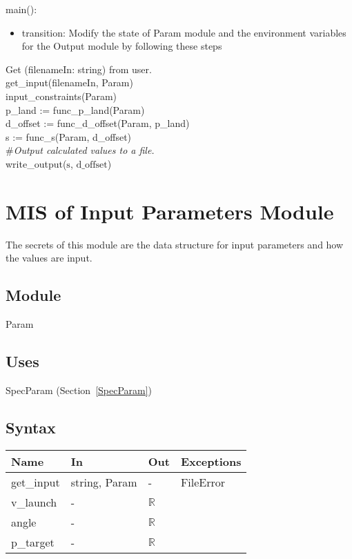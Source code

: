\documentclass[12pt, titlepage]{article}
\begin{document}
\noindent main():
\begin{itemize}
\item transition: Modify the state of Param module and the environment variables
  for the Output module by following these steps\\
\end{itemize}

\noindent Get (filenameIn: string) from user.\\
\noindent get\_input(filenameIn, Param)\\
\noindent input\_constraints(Param)\\
\noindent p\_land := func\_p\_land(Param)\\
\noindent d\_offset := func\_d\_offset(Param, p\_land)\\
\noindent s := func\_s(Param, d\_offset)\\
\noindent \#\textit{Output calculated values to a file.}\\
\noindent write\_output($\text{s}$, $\text{d\_offset}$)\\

\newpage

\section{MIS of Input Parameters Module} \label{Parameters}

The secrets of this module are the data structure for input parameters and how 
the values are input.

\subsection{Module}

Param

\subsection{Uses}

SpecParam (Section~\ref{SpecParam})

\subsection{Syntax}

\begin{tabular}{p{3cm} p{1cm} p{1cm} >{\raggedright\arraybackslash}p{9cm}}
\toprule
\textbf{Name} & \textbf{In} & \textbf{Out} & \textbf{Exceptions} \\
\midrule
get\_input & string, Param & - &  FileError \\
v\_launch & - & $\mathbb{R}$\\
angle & - & $\mathbb{R}$\\
p\_target & - & $\mathbb{R}$\\
\bottomrule
\end{tabular}
\end{document}

